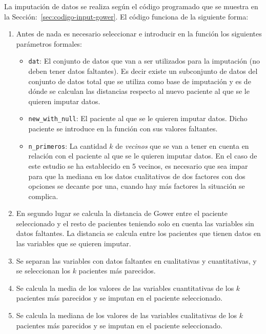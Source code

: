 La imputación de datos se realiza según el código programado que se muestra en la Sección:~\ref{sec:codigo-input-gower}. El código funciona de la siguiente forma: 
\begin{enumerate}
    \item Antes de nada es necesario seleccionar e introducir en la función los siguientes parámetros formales: 
    \begin{itemize}
        \item \texttt{dat}: El conjunto de datos que van a ser utilizados para la imputación (no deben tener datos faltantes). Es decir existe un subconjunto de datos del conjunto de datos total que se utiliza como base de imputación y es de dónde se calculan las distancias respecto al nuevo paciente al que se le quieren imputar datos.
        \item \texttt{new\_with\_null}: El paciente al que se le quieren imputar datos. Dicho paciente se introduce en la función con sus valores faltantes.
        \item \texttt{n\_primeros}: La cantidad $k$ de \textit{vecinos} que se van a tener en cuenta en relación con el paciente al que se le quieren imputar datos. En el caso de este estudio se ha establecido en 5 vecinos, es necesario que sea impar para que la mediana en los datos cualitativos de dos factores con dos opciones se decante por una, cuando hay más factores la situación se complica. 
    \end{itemize}
    \item En segundo lugar se calcula la distancia de Gower entre el paciente seleccionado y el resto de pacientes teniendo solo en cuenta las variables sin datos faltantes. La distancia se calcula entre los pacientes que tienen datos en las variables que se quieren imputar.
    \item Se separan las variables con datos faltantes en cualitativas y cuantitativas, y se seleccionan los $k$ pacientes más parecidos.
    \item Se calcula la media de los valores de las variables cuantitativas de los $k$ pacientes más parecidos y se imputan en el paciente seleccionado.
    \item Se calcula la mediana de los valores de las variables cualitativas de los $k$ pacientes más parecidos y se imputan en el paciente seleccionado.
\end{enumerate}

